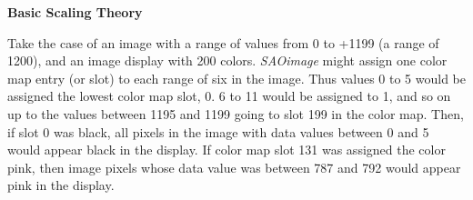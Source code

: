 {\bf Basic Scaling Theory}
\par
\vspace{0.1in}
Take the case of an image with a range of values from 0 to +1199 (a
range of 1200), and an image display with 200 colors.  {\em SAOimage}
might assign one color map entry (or slot) to each range of six in the
image.  Thus values 0 to 5 would be assigned the lowest color map
slot, 0.  6 to 11 would be assigned to 1, and so on up to the values
between 1195 and 1199 going to slot 199 in the color map.  Then, if
slot 0 was black, all pixels in the image with data values between 0
and 5 would appear black in the display.  If color map slot 131 was
assigned the color pink, then image pixels whose data value was
between 787 and 792 would appear pink in the display.
\par
\vspace{0.1in}

